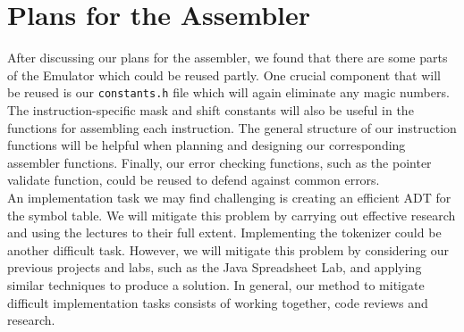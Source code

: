 \documentclass[10pt]{article}
\begin{document}
\section*{Plans for the Assembler}
After discussing our plans for the assembler, we found that there are some parts of the Emulator which could be reused partly. One crucial component that will be reused is our {\tt constants.h} file which will again eliminate any magic numbers. The instruction-specific mask and shift constants will also be useful in the functions for assembling each instruction. The general structure of our instruction functions will be helpful when planning and designing our corresponding assembler functions. Finally, our error checking functions, such as the pointer validate function, could be reused to defend against common errors.
\\ 

An implementation task we may find challenging is creating an efficient ADT for the symbol table. We will mitigate this problem by carrying out effective research and using the lectures to their full extent. Implementing the tokenizer could be another difficult task. However, we will mitigate this problem by considering our previous projects and labs, such as the Java Spreadsheet Lab, and applying similar techniques to produce a solution. In general, our method to mitigate difficult implementation tasks consists of working together, code reviews and research. 
\end{document}

